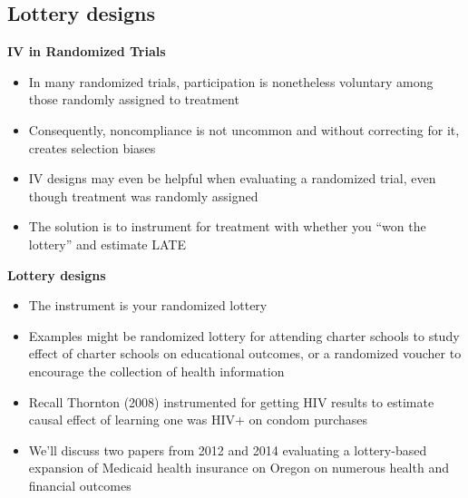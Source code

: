 \documentclass[notes=show]{beamer}
\begin{document}
\subsection{Lottery designs}


\begin{frame}

	\begin{center}
	\textbf{IV in Randomized Trials}
	\end{center}
	
	\begin{itemize}
	\item In many randomized trials, participation is nonetheless voluntary among those randomly assigned to treatment
	\item Consequently, noncompliance is not uncommon and without correcting for it, creates selection biases
	\item IV designs may even be helpful when evaluating a randomized trial, even though treatment was randomly assigned
	\item The solution is to instrument for treatment with whether you ``won the lottery'' and estimate LATE
	\end{itemize}
	
\end{frame}

	
\begin{frame}[plain]
	\begin{center}
	\textbf{Lottery designs}
	\end{center}
	
	\begin{itemize}
	\item The instrument is your randomized lottery
	\item Examples might be randomized lottery for attending charter schools to study effect of charter schools on educational outcomes, or a randomized voucher to encourage the collection of health information
	\item Recall Thornton (2008) instrumented for getting HIV results to estimate causal effect of learning one was HIV+ on condom purchases
	\item We'll discuss two papers from 2012 and 2014 evaluating a lottery-based expansion of Medicaid health insurance on Oregon on numerous health and financial outcomes
	\end{itemize}
\end{frame}
\end{document}
